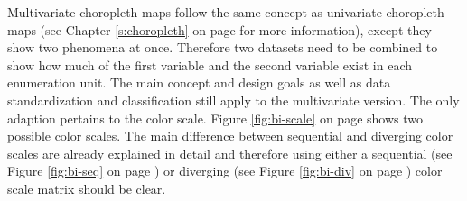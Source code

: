 
Multivariate choropleth maps follow the same concept as univariate choropleth maps (see Chapter \ref{s:choropleth} on page \pageref{s:choropleth} for more information), except they show two phenomena at once. Therefore two datasets need to be combined to show how much of the first variable and the second variable exist in each enumeration unit. The main concept and design goals as well as data standardization and classification still apply to the multivariate version. The only adaption pertains to the color scale. Figure \ref{fig:bi-scale} on page \pageref{fig:bi-scale} shows two possible color scales. The main difference between sequential and diverging color scales are already explained in detail and therefore using either a sequential (see Figure \ref{fig:bi-seq} on page \pageref{fig:bi-seq}) or diverging (see Figure \ref{fig:bi-div} on page \pageref{fig:bi-div}) color scale matrix should be clear.


